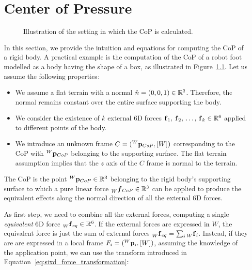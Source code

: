 \chapter{Center of Pressure}
\label{appendix:center_of_pressure}

\begin{figure}
    \centering
    \caption{Illustration of the setting in which the \acs{CoP} is calculated.}
    \label{fig:center_of_pressure}
\end{figure}

In this section, we provide the intuition and equations for computing the \ac{CoP} of a rigid body.
A practical example is the computation of the \ac{CoP} of a robot foot modelled as a body having the shape of a box, as illustrated in Figure~\ref{fig:center_of_pressure}.
Let us assume the following properties:
%
\begin{itemize}
    \item We assume a flat terrain with a normal $\hat{n} = (0, 0, 1) \in \realn^3$. Therefore, the normal remains constant over the entire surface supporting the body.
    \item We consider the existence of $k$ external 6D forces $\forcesix_1,\, \forcesix_2,\, \dots, \, \forcesix_k \in \realn^6$ applied to different points of the body.
    \item We introduce an unknown frame $C = (\pos[W]_{CoP}, [W])$ corresponding to the \ac{CoP} with $\pos[W]_{CoP}$ belonging to the supporting surface. The flat terrain assumption implies that the $z$ axis of the $C$ frame is normal to the terrain.
\end{itemize}
%
\begin{definition*}
    The \ac{CoP} is the point $\pos[W]_{CoP} \in \realn^3$ belonging to the rigid body's supporting surface to which a pure linear force $\forcelin[W]_{CoP} \in \realn^3$ can be applied to produce the equivalent effects along the normal direction of all the external 6D forces.
\end{definition*}
%
As first step, we need to combine all the external forces, computing a single \emph{equivalent} 6D force $\forcesix[W]_{eq} \in \realn^6$.
If the external forces are expressed in $W$, the equivalent force is just the sum of external forces $\forcesix[W]_{eq} = \sum_{i} \forcesix[W]_i$.
Instead, if they are are expressed in a local frame $F_i = (\pos[W]_i, [W])$, assuming the knowledge of the application point, we can use the transform introduced in Equation~\eqref{eq:sixd_force_transformation}:
